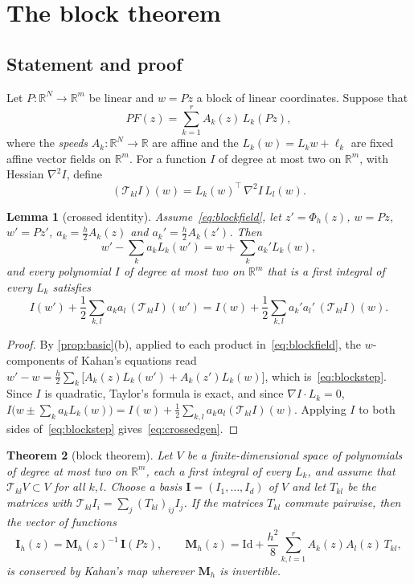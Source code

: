 \documentclass[11pt,a4paper]{article}
\newtheorem{theorem}{Theorem}[section]
\newtheorem{lemma}[theorem]{Lemma}
\theoremstyle{definition}
\theoremstyle{remark}
\newcommand{\R}{\mathbb{R}}
\newcommand{\Id}{\mathrm{Id}}
\newcommand{\T}{\mathcal{T}}
\newcommand{\bI}{\mathbf{I}}
\newcommand{\bM}{\mathbf{M}}
\newcommand{\tr}{^{\!\top}}
\begin{document}
\section{The block theorem}\label{sec:block}

\subsection{Statement and proof}

Let $P\colon\R^N\to\R^m$ be linear and $w=Pz$ a block of linear coordinates. Suppose that
\begin{equation}\label{eq:blockfield}
PF(z)=\sum_{k=1}^rA_k(z)\,L_k(Pz),
\end{equation}
where the \emph{speeds} $A_k\colon\R^N\to\R$ are affine and the $L_k(w)=L_kw+\ell_k$ are fixed affine vector
fields on $\R^m$. For a function $I$ of degree at most two on $\R^m$, with Hessian $\nabla^2I$, define
\[
(\T_{kl}I)(w)=L_k(w)\tr\,\nabla^2I\,L_l(w).
\]

\begin{lemma}[crossed identity]\label{lem:crossed}
Assume~\eqref{eq:blockfield}, let $z'=\Phi_h(z)$, $w=Pz$, $w'=Pz'$, $a_k=\frac h2A_k(z)$ and
$a_k'=\frac h2A_k(z')$. Then
\begin{equation}\label{eq:blockstep}
w'-\sum_ka_kL_k(w')=w+\sum_ka_k'L_k(w),
\end{equation}
and every polynomial $I$ of degree at most two on $\R^m$ that is a first integral of every $L_k$ satisfies
\begin{equation}\label{eq:crossedgen}
I(w')+\frac12\sum_{k,l}a_ka_l\,(\T_{kl}I)(w')=I(w)+\frac12\sum_{k,l}a_k'a_l'\,(\T_{kl}I)(w).
\end{equation}
\end{lemma}

\begin{proof}
By \cref{prop:basic}(b), applied to each product in~\eqref{eq:blockfield}, the $w$-components of Kahan's
equations read $w'-w=\frac h2\sum_k\big[A_k(z)L_k(w')+A_k(z')L_k(w)\big]$, which is~\eqref{eq:blockstep}.
Since $I$ is quadratic, Taylor's formula is exact, and since $\nabla I\cdot L_k=0$,
$I\big(w\pm\sum_ka_kL_k(w)\big)=I(w)+\frac12\sum_{k,l}a_ka_l(\T_{kl}I)(w)$. Applying $I$ to both sides
of~\eqref{eq:blockstep} gives~\eqref{eq:crossedgen}.
\end{proof}

\begin{theorem}[block theorem]\label{thm:block}
Let $V$ be a finite-dimensional space of polynomials of degree at most two on $\R^m$, each a first integral
of every $L_k$, and assume that $\T_{kl}V\subset V$ for all $k,l$. Choose a basis $\bI=(I_1,\dots,I_d)$ of $V$
and let $T_{kl}$ be the matrices with $\T_{kl}I_i=\sum_j(T_{kl})_{ij}I_j$. If the matrices $T_{kl}$ commute
pairwise, then the vector of functions
\begin{equation}\label{eq:blockinv}
\bI_h(z)=\bM_h(z)^{-1}\,\bI(Pz),\qquad\bM_h(z)=\Id+\frac{h^2}{8}\sum_{k,l=1}^rA_k(z)A_l(z)\,T_{kl},
\end{equation}
is conserved by Kahan's map wherever $\bM_h$ is invertible.
\end{theorem}
\end{document}
